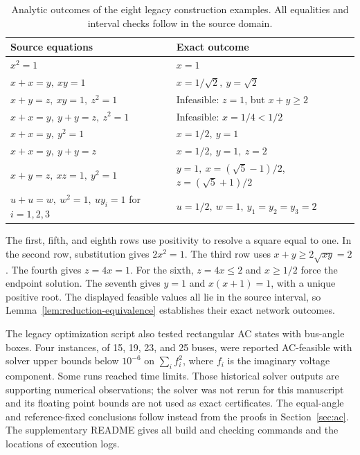 \begin{table}[htbp]
\centering
\small
\begin{tabular}{@{}p{}p{}@{}}
\toprule
Source equations & Exact outcome \\
\midrule
$x^2=1$ & $x=1$ \\
$x+x=y,\ xy=1$ & $x=1/\sqrt2,\ y=\sqrt2$ \\
$x+y=z,\ xy=1,\ z^2=1$ & Infeasible: $z=1$, but $x+y\ge2$ \\
$x+x=y,\ y+y=z,\ z^2=1$ & Infeasible: $x=1/4<1/2$ \\
$x+x=y,\ y^2=1$ & $x=1/2,\ y=1$ \\
$x+x=y,\ y+y=z$ & $x=1/2,\ y=1,\ z=2$ \\
$x+y=z,\ xz=1,\ y^2=1$ & $y=1,\ x=(\sqrt5-1)/2$,\newline
                                      $z=(\sqrt5+1)/2$ \\
$u+u=w,\ w^2=1,\ uy_i=1$\newline
\hspace*{1em}for $i=1,2,3$
 & $u=1/2,\ w=1,\ y_1=y_2=y_3=2$ \\
\bottomrule
\end{tabular}
\caption{Analytic outcomes of the eight legacy construction examples.
All equalities and interval checks follow in the source domain.}
\label{tab:legacy-examples}
\end{table}

The first, fifth, and eighth rows use positivity to resolve a square equal
to one. In the second row, substitution gives $2x^2=1$. The third row uses
$x+y\ge2\sqrt{xy}=2$. The fourth gives $z=4x=1$. For the sixth,
$z=4x\le2$ and $x\ge1/2$ force the endpoint solution. The seventh gives
$y=1$ and $x(x+1)=1$, with a unique positive root. The displayed feasible
values all lie in the source interval, so Lemma~\ref{lem:reduction-equivalence}
establishes their exact network outcomes.

The legacy optimization script also tested rectangular AC states with
bus-angle boxes. Four instances, of 15, 19, 23, and 25 buses, were reported
AC-feasible with solver upper bounds below $10^{-6}$ on $\sum_i f_i^2$,
where $f_i$ is the imaginary voltage component. Some runs reached time limits. Those historical solver outputs are supporting numerical
observations; the solver was not rerun for this manuscript and its floating
point bounds are not used as exact certificates. The equal-angle and
reference-fixed conclusions follow instead from the proofs in
Section~\ref{sec:ac}. The supplementary README gives all build and checking
commands and the locations of execution logs.
